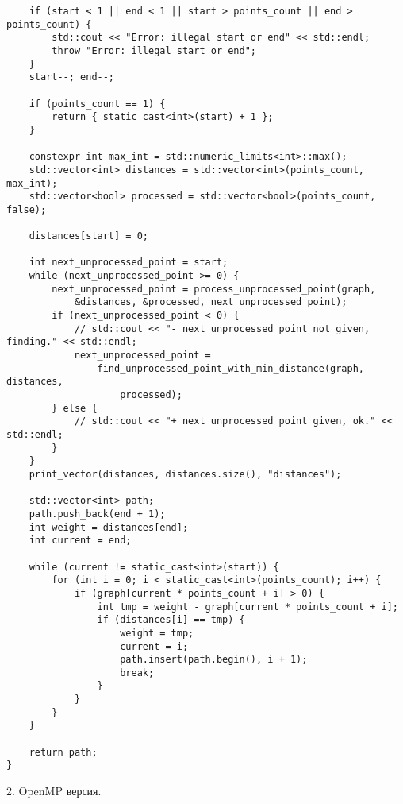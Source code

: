 \documentclass{report}
\begin{document}
\begin{lstlisting}
    if (start < 1 || end < 1 || start > points_count || end > points_count) {
        std::cout << "Error: illegal start or end" << std::endl;
        throw "Error: illegal start or end";
    }
    start--; end--;

    if (points_count == 1) {
        return { static_cast<int>(start) + 1 };
    }

    constexpr int max_int = std::numeric_limits<int>::max();
    std::vector<int> distances = std::vector<int>(points_count, max_int);
    std::vector<bool> processed = std::vector<bool>(points_count, false);

    distances[start] = 0;

    int next_unprocessed_point = start;
    while (next_unprocessed_point >= 0) {
        next_unprocessed_point = process_unprocessed_point(graph,
            &distances, &processed, next_unprocessed_point);
        if (next_unprocessed_point < 0) {
            // std::cout << "- next unprocessed point not given, finding." << std::endl;
            next_unprocessed_point =
                find_unprocessed_point_with_min_distance(graph, distances,
                    processed);
        } else {
            // std::cout << "+ next unprocessed point given, ok." << std::endl;
        }
    }
    print_vector(distances, distances.size(), "distances");

    std::vector<int> path;
    path.push_back(end + 1);
    int weight = distances[end];
    int current = end;

    while (current != static_cast<int>(start)) {
        for (int i = 0; i < static_cast<int>(points_count); i++) {
            if (graph[current * points_count + i] > 0) {
                int tmp = weight - graph[current * points_count + i];
                if (distances[i] == tmp) {
                    weight = tmp;
                    current = i;
                    path.insert(path.begin(), i + 1);
                    break;
                }
            }
        }
    }

    return path;
}
\end{lstlisting}
\par 2. OpenMP версия.
\end{document}
